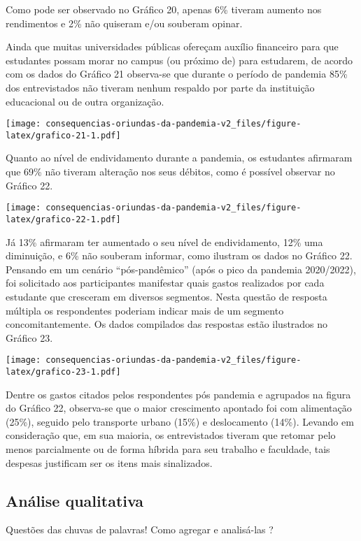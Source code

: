 \documentclass[
]{article}
\begin{document}
Como pode ser observado no Gráfico 20, apenas 6\% tiveram aumento nos
rendimentos e 2\% não quiseram e/ou souberam opinar.

Ainda que muitas universidades públicas ofereçam auxílio financeiro para
que estudantes possam morar no campus (ou próximo de) para estudarem, de
acordo com os dados do Gráfico 21 observa-se que durante o período de
pandemia 85\% dos entrevistados não tiveram nenhum respaldo por parte da
instituição educacional ou de outra organização.

\texttt{[image: consequencias-oriundas-da-pandemia-v2\_files/figure-latex/grafico-21-1.pdf]}

Quanto ao nível de endividamento durante a pandemia, os estudantes
afirmaram que 69\% não tiveram alteração nos seus débitos, como é
possível observar no Gráfico 22.

\texttt{[image: consequencias-oriundas-da-pandemia-v2\_files/figure-latex/grafico-22-1.pdf]}

Já 13\% afirmaram ter aumentado o seu nível de endividamento, 12\% uma
diminuição, e 6\% não souberam informar, como ilustram os dados no
Gráfico 22. Pensando em um cenário ``pós-pandêmico'' (após o pico da
pandemia 2020/2022), foi solicitado aos participantes manifestar quais
gastos realizados por cada estudante que cresceram em diversos
segmentos. Nesta questão de resposta múltipla os respondentes poderiam
indicar mais de um segmento concomitantemente. Os dados compilados das
respostas estão ilustrados no Gráfico 23.

\texttt{[image: consequencias-oriundas-da-pandemia-v2\_files/figure-latex/grafico-23-1.pdf]}

Dentre os gastos citados pelos respondentes pós pandemia e agrupados na
figura do Gráfico 22, observa-se que o maior crescimento apontado foi
com alimentação (25\%), seguido pelo transporte urbano (15\%) e
deslocamento (14\%). Levando em consideração que, em sua maioria, os
entrevistados tiveram que retomar pelo menos parcialmente ou de forma
híbrida para seu trabalho e faculdade, tais despesas justificam ser os
itens mais sinalizados.

\hypertarget{anuxe1lise-qualitativa}{%
\subsection{Análise qualitativa}\label{anuxe1lise-qualitativa}}

Questões das chuvas de palavras! Como agregar e analisá-las ?
\end{document}
